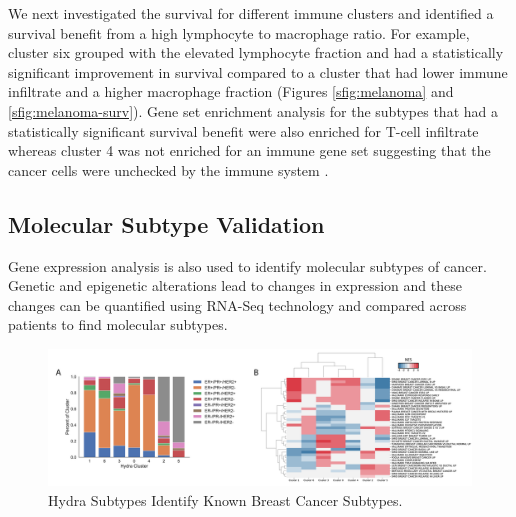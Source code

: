 \documentclass[fleqn,10pt]{wlscirep}
\begin{document}
We next investigated the survival for different immune clusters and identified a survival benefit from a high lymphocyte to macrophage ratio. For example, cluster six grouped with the elevated lymphocyte fraction and had a statistically significant improvement in survival compared to a cluster that had lower immune infiltrate and a higher macrophage fraction (Figures \ref{sfig:melanoma} and \ref{sfig:melanoma-surv}). Gene set enrichment analysis for the subtypes that had a statistically significant survival benefit were also enriched for T-cell infiltrate whereas cluster 4 was not enriched for an immune gene set suggesting that the cancer cells were unchecked by the immune system . 

\subsection*{Molecular Subtype Validation}
Gene expression analysis is also used to identify molecular subtypes of cancer. Genetic and epigenetic alterations lead to changes in expression and these changes can be quantified using RNA-Seq technology and compared across patients to find molecular subtypes.


\begin{figure}
	\centering
	\includegraphics[width=1.1\linewidth]{images/tcga-brca-subtyping-figure@2x.png}
	\caption{Hydra Subtypes Identify Known Breast Cancer Subtypes.}
	\label{sfig:brca-subtypes}
\end{figure}
\end{document}
